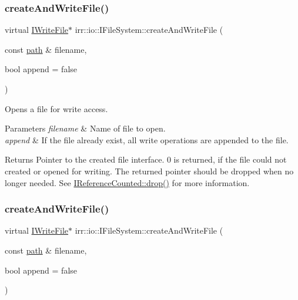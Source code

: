 \subsubsection{\texorpdfstring{create\+And\+Write\+File()}{createAndWriteFile()}\hspace{0.1cm}{\footnotesize\ttfamily [1/2]}}
{\footnotesize\ttfamily virtual \hyperlink{classirr_1_1io_1_1IWriteFile}{I\+Write\+File}$\ast$ irr\+::io\+::\+I\+File\+System\+::create\+And\+Write\+File (\begin{DoxyParamCaption}\item[{const \hyperlink{namespaceirr_1_1io_a6468281622ce3a1c46b72e19f32dded5}{path} \&}]{filename,  }\item[{bool}]{append = {\ttfamily false} }\end{DoxyParamCaption})\hspace{0.3cm}{\ttfamily [pure virtual]}}



Opens a file for write access. 


\begin{DoxyParams}{Parameters}
{\em filename} & Name of file to open. \\
\hline
{\em append} & If the file already exist, all write operations are appended to the file. \\
\hline
\end{DoxyParams}
\begin{DoxyReturn}{Returns}
Pointer to the created file interface. 0 is returned, if the file could not created or opened for writing. The returned pointer should be dropped when no longer needed. See \hyperlink{classirr_1_1IReferenceCounted_a03856a09355b89d178090c4a5f738543}{I\+Reference\+Counted\+::drop()} for more information. 
\end{DoxyReturn}
\mbox{\label{classirr_1_1io_1_1IFileSystem_af0ed28b697936ee8aa60a5a0877ac90a}} 
\subsubsection{\texorpdfstring{create\+And\+Write\+File()}{createAndWriteFile()}\hspace{0.1cm}{\footnotesize\ttfamily [2/2]}}
{\footnotesize\ttfamily virtual \hyperlink{classirr_1_1io_1_1IWriteFile}{I\+Write\+File}$\ast$ irr\+::io\+::\+I\+File\+System\+::create\+And\+Write\+File (\begin{DoxyParamCaption}\item[{const \hyperlink{namespaceirr_1_1io_a6468281622ce3a1c46b72e19f32dded5}{path} \&}]{filename,  }\item[{bool}]{append = {\ttfamily false} }\end{DoxyParamCaption})\hspace{0.3cm}{\ttfamily [pure virtual]}}



